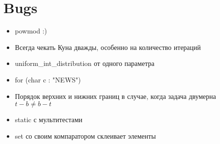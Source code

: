 \section{Bugs}

\begin{itemize}
    \item powmod :)

    \item Всегда чекать Куна дважды, особенно на количество итераций
    
    \item uniform\_int\_distribution от одного параметра
    
    \item for (char c : "NEWS")
    
    \item Порядок верхних и нижних границ в случае, когда задача двумерна
    $t - b \neq b - t$
    
    \item static с мультитестами

    \item set со своим компаратором склеивает элементы
\end{itemize}
